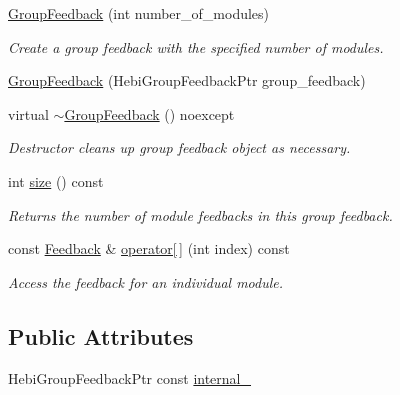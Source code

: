 \begin{DoxyCompactItemize}
\item 
\mbox{\label{classhebi_1_1GroupFeedback_af0a41119c345d68c6ae390ff39be77fc}} 
\hyperlink{classhebi_1_1GroupFeedback_af0a41119c345d68c6ae390ff39be77fc}{Group\+Feedback} (int number\+\_\+of\+\_\+modules)
\begin{DoxyCompactList}\small\item\em Create a group feedback with the specified number of modules. \end{DoxyCompactList}\item 
\hyperlink{classhebi_1_1GroupFeedback_ac12b1f1320eb14943d1b2600b0eecb1b}{Group\+Feedback} (Hebi\+Group\+Feedback\+Ptr group\+\_\+feedback)
\item 
\mbox{\label{classhebi_1_1GroupFeedback_aef61ac5e6ac95a4c981cb6fc2d461d5f}} 
virtual \hyperlink{classhebi_1_1GroupFeedback_aef61ac5e6ac95a4c981cb6fc2d461d5f}{$\sim$\+Group\+Feedback} () noexcept
\begin{DoxyCompactList}\small\item\em Destructor cleans up group feedback object as necessary. \end{DoxyCompactList}\item 
\mbox{\label{classhebi_1_1GroupFeedback_a7509084e361feaf90d857d77afa4e4c0}} 
int \hyperlink{classhebi_1_1GroupFeedback_a7509084e361feaf90d857d77afa4e4c0}{size} () const
\begin{DoxyCompactList}\small\item\em Returns the number of module feedbacks in this group feedback. \end{DoxyCompactList}\item 
\mbox{\label{classhebi_1_1GroupFeedback_a4043d1389b921deec5613736c8d36460}} 
const \hyperlink{classhebi_1_1Feedback}{Feedback} \& \hyperlink{classhebi_1_1GroupFeedback_a4043d1389b921deec5613736c8d36460}{operator\mbox{[}$\,$\mbox{]}} (int index) const
\begin{DoxyCompactList}\small\item\em Access the feedback for an individual module. \end{DoxyCompactList}\end{DoxyCompactItemize}
\subsection*{Public Attributes}
\begin{DoxyCompactItemize}
\item 
Hebi\+Group\+Feedback\+Ptr const \hyperlink{classhebi_1_1GroupFeedback_ac549a7728905ca72e5a19256afaf9d49}{internal\+\_\+}
\end{DoxyCompactItemize}


